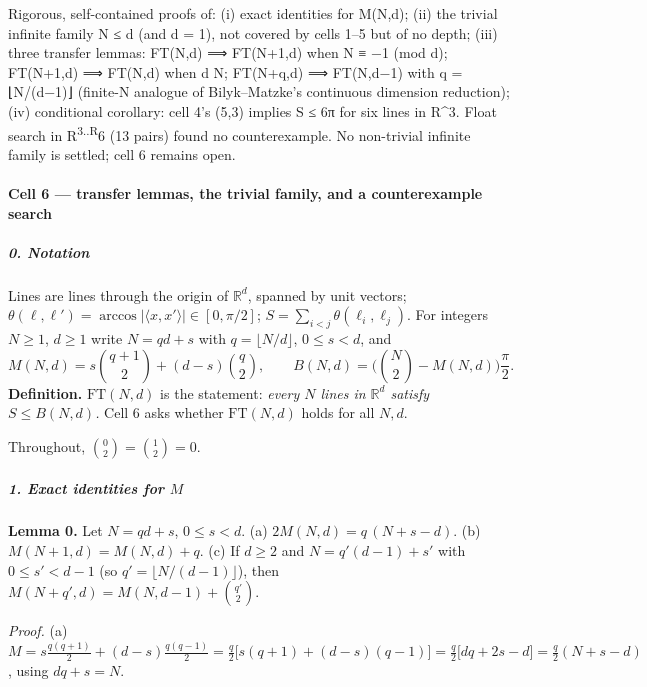 
Rigorous, self-contained proofs of: (i) exact identities for M(N,d);
(ii) the trivial infinite family N ≤ d (and d = 1), not covered by cells
1--5 but of no depth; (iii) three transfer lemmas: FT(N,d) ⟹ FT(N+1,d)
when N ≡ −1 (mod d); FT(N+1,d) ⟹ FT(N,d) when d \textbar{} N; FT(N+q,d)
⟹ FT(N,d−1) with q = ⌊N/(d−1)⌋ (finite-N analogue of Bilyk--Matzke's
continuous dimension reduction); (iv) conditional corollary: cell 4's
(5,3) implies S ≤ 6π for six lines in R\^{}3. Float search in
R\textsuperscript{3..R}6 (13 pairs) found no counterexample. No
non-trivial infinite family is settled; cell 6 remains open.


\paragraph{Cell 6 --- transfer lemmas, the trivial family, and a
counterexample
search}\label{cell-6-transfer-lemmas-the-trivial-family-and-a-counterexample-search}

\subparagraph{0. Notation}\label{notation}

Lines are lines through the origin of \(\mathbb R^d\), spanned by unit
vectors;
\(\theta(\ell,\ell')=\arccos|\langle x,x'\rangle|\in[0,\pi/2]\);
\(S=\sum_{i<j}\theta(\ell_i,\ell_j)\). For integers \(N\ge1\), \(d\ge1\)
write \(N=qd+s\) with \(q=\lfloor N/d\rfloor\), \(0\le s<d\), and
\[M(N,d)=s\binom{q+1}{2}+(d-s)\binom{q}{2},\qquad B(N,d)=\Big(\binom N2-M(N,d)\Big)\frac{\pi}{2}.\]
\textbf{Definition.} \(\mathrm{FT}(N,d)\) is the statement: \emph{every
\(N\) lines in \(\mathbb R^d\) satisfy \(S\le B(N,d)\).} Cell 6 asks
whether \(\mathrm{FT}(N,d)\) holds for all \(N,d\).

Throughout, \(\binom{0}{2}=\binom{1}{2}=0\).

\subparagraph{\texorpdfstring{1. Exact identities for
\(M\)}{1. Exact identities for M}}\label{exact-identities-for-m}

\textbf{Lemma 0.} Let \(N=qd+s\), \(0\le s<d\). (a)
\(2M(N,d)=q\,(N+s-d)\). (b) \(M(N+1,d)=M(N,d)+q\). (c) If \(d\ge2\) and
\(N=q'(d-1)+s'\) with \(0\le s'<d-1\) (so
\(q'=\lfloor N/(d-1)\rfloor\)), then
\(M(N+q',d)=M(N,d-1)+\binom{q'}{2}\).

\emph{Proof.} (a)
\(M=s\frac{q(q+1)}2+(d-s)\frac{q(q-1)}2=\frac q2\big[s(q+1)+(d-s)(q-1)\big]=\frac q2\big[dq+2s-d\big]=\frac q2(N+s-d)\),
using \(dq+s=N\).

